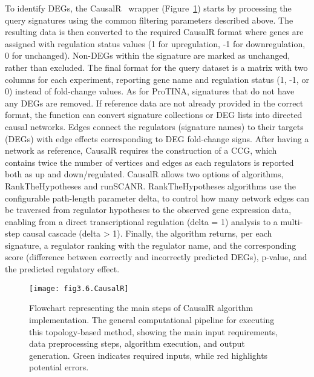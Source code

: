 To identify DEGs, the CausalR~\cite{RN32} wrapper (Figure~\ref{fig:fig3.6.CausalR}) starts by processing the query signatures using the common filtering parameters described above. The resulting data is then converted to the required CausalR format where genes are assigned with regulation status values (1 for upregulation, -1 for downregulation, 0 for unchanged). Non-DEGs within the signature are marked as unchanged, rather than excluded. The final format for the query dataset is a matrix with two columns for each experiment, reporting gene name and regulation status (1, -1, or 0) instead of fold-change values. As for ProTINA, signatures that do not have any DEGs are removed. If reference data are not already provided in the correct format, the function can convert signature collections or DEG lists into directed causal networks. Edges connect the regulators (signature names) to their targets (DEGs) with edge effects corresponding to DEG fold-change signs. 
After having a network as reference, CausalR requires the construction of a \gls{CCG}, which contains twice the number of vertices and edges as each regulators is reported both as up and down/regulated. CausalR allows two options of algorithms, RankTheHypotheses and runSCANR. RankTheHypotheses algorithms use the configurable path-length parameter delta, to control how many network edges can be traversed from regulator hypotheses to the observed gene expression data, enabling from a direct transcriptional regulation (delta = 1) analysis to a multi-step causal cascade (delta > 1). Finally, the algorithm returns, per each signature, a regulator ranking with the regulator name, and the corresponding score (difference between correctly and incorrectly predicted DEGs), p-value, and the predicted regulatory effect.

\begin{figure}[htbp]
    \centering
    \texttt{[image: fig3.6.CausalR]}
    \caption[Flowchart representing the main steps of CausalR algorithm implementation.]{Flowchart representing the main steps of CausalR algorithm implementation. The general computational pipeline for executing this topology-based method, showing the main input requirements, data preprocessing steps, algorithm execution, and output generation. Green indicates required inputs, while red highlights potential errors.}
    \label{fig:fig3.6.CausalR}
\end{figure}


